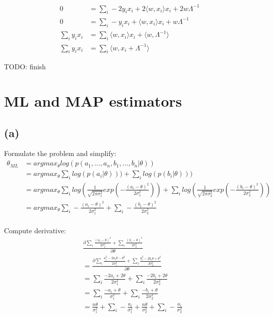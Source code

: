 \documentclass[a4paper]{scrartcl}
\begin{document}
    \begin{align*}
      0 &= \sum_i -2y_i x_i + 2 \langle w,  x_i \rangle x_i + 2 w \Lambda^{-1}\\
      0 &= \sum_i -y_i x_i + \langle w,  x_i \rangle x_i + w \Lambda^{-1}\\
      \sum_i y_i x_i &= \sum_i  \langle w,  x_i \rangle x_i + \langle w,  \Lambda^{-1} \rangle\\
      \sum_i y_i x_i &= \sum_i  \langle w,  x_i +  \Lambda^{-1} \rangle
    \end{align*}

    TODO: finish



\section*{ML and MAP estimators}
  \subsection*{(a)}
    Formulate the problem and simplify:
    \begin{align*}
      \theta_{ML} 
      &= argmax_\theta log(p(a_1, \dots , a_n, b_1, \dots , b_n \vert \theta))\\
      &= argmax_\theta \sum_i log(p(a_i \vert \theta))) + \sum_i log(p(b_i \vert \theta )))\\
      &= argmax_\theta \sum_i log(\frac{1}{\sqrt{2\pi \sigma_1^2}} exp(-\frac{(a_i - \theta )^2}{2\sigma_1^2})) + \sum_i log(\frac{1}{\sqrt{2\pi \sigma_2^2}} exp(-\frac{(b_i - \theta )^2}{2\sigma_2^2})) \\
      &= argmax_\theta \sum_i -\frac{(a_i - \theta )^2}{2\sigma_1^2} + \sum_i-\frac{(b_i - \theta )^2}{2\sigma_2^2} \\
    \end{align*}

    Compute derivative:
    \begin{align*}
      & \frac{\partial \sum_i \frac{(a_i - \theta )^2}{2\sigma_1^2} + \sum_i \frac{(b_i - \theta )^2}{2\sigma_2^2}}{\partial \theta}\\
      &= \frac{\partial \sum_i \frac{a_i^2 - 2a_i \theta - \theta^2}{2\sigma_1^2} + \sum_i \frac{b_i^2 -2b_i \theta + \theta^2}{2\sigma_2^2}}{\partial \theta}\\
      &= \sum_i \frac{-2a_i + 2\theta}{2\sigma_1^2} + \sum_i \frac{-2b_i  + 2\theta}{2\sigma_2^2}\\
      &= \sum_i \frac{-a_i + \theta}{\sigma_1^2} + \sum_i \frac{-b_i  + \theta}{2\sigma_2^2}\\
      &= \frac{n \theta }{\sigma_1^2} + \sum_i - \frac{a_i}{\sigma_1^2} + \frac{n \theta }{\sigma_2^2} + \sum_i - \frac{a_i}{\sigma_2^2}
    \end{align*}
\end{document}
